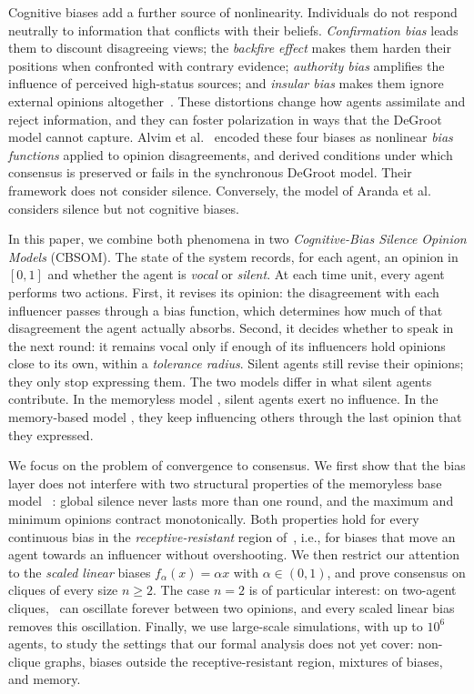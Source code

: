 Cognitive biases add a further source of nonlinearity. Individuals do not
respond neutrally to information that conflicts with their beliefs.
\emph{Confirmation bias} leads them to discount disagreeing views; the
\emph{backfire effect} makes them harden their positions when confronted with
contrary evidence; \emph{authority bias} amplifies the influence of perceived
high-status sources; and \emph{insular bias} makes them ignore external
opinions altogether~\cite{Aronson2010,Nyhan2010,Friedrich2020,Alvim2024}.
These distortions change how agents assimilate and reject information, and
they can foster polarization in ways that the DeGroot model cannot capture.
Alvim et al.~\cite{Alvim2024} encoded these four biases as nonlinear
\emph{bias functions} applied to opinion disagreements, and derived
conditions under which consensus is preserved or fails in the synchronous
DeGroot model. Their framework does not consider silence. Conversely, the
model of Aranda et al.~\cite{aranda2024sound} considers silence but not
cognitive biases.

In this paper, we combine both phenomena in two \emph{Cognitive-Bias Silence
Opinion Models} (CBSOM). The state of the system records, for each agent, an
opinion in $[0,1]$ and whether the agent is \emph{vocal} or \emph{silent}. At
each time unit, every agent performs two actions. First, it revises its
opinion: the disagreement with each influencer passes through a bias function,
which determines how much of that disagreement the agent actually absorbs.
Second, it decides whether to speak in the next round: it remains vocal only
if enough of its influencers hold opinions close to its own, within a
\emph{tolerance radius}. Silent agents still revise their opinions; they only
stop expressing them. The two models differ in what silent agents contribute.
In the memoryless model \CBSOMminus, silent agents exert no influence. In the
memory-based model \CBSOMplus, they keep influencing others through the last
opinion that they expressed.

We focus on the problem of convergence to consensus. We first show that the
bias layer does not interfere with two structural properties of the
memoryless base model \SOMminus~\cite{aranda2024sound}: global silence never
lasts more than one round, and the maximum and minimum opinions contract
monotonically. Both properties hold for every continuous bias in the
\emph{receptive-resistant} region of~\cite{Alvim2024}, i.e., for biases that
move an agent towards an influencer without overshooting. We then restrict
our attention to the \emph{scaled linear} biases $f_\alpha(x)=\alpha x$ with
$\alpha\in(0,1)$, and prove consensus on cliques of every size $n\ge 2$. The
case $n=2$ is of particular interest: on two-agent cliques, \SOMminus\ can
oscillate forever between two opinions, and every scaled linear bias removes
this oscillation. Finally, we use large-scale simulations, with up to $10^{6}$
agents, to study the settings that our formal analysis does not yet cover:
non-clique graphs, biases outside the receptive-resistant region, mixtures of
biases, and memory.


